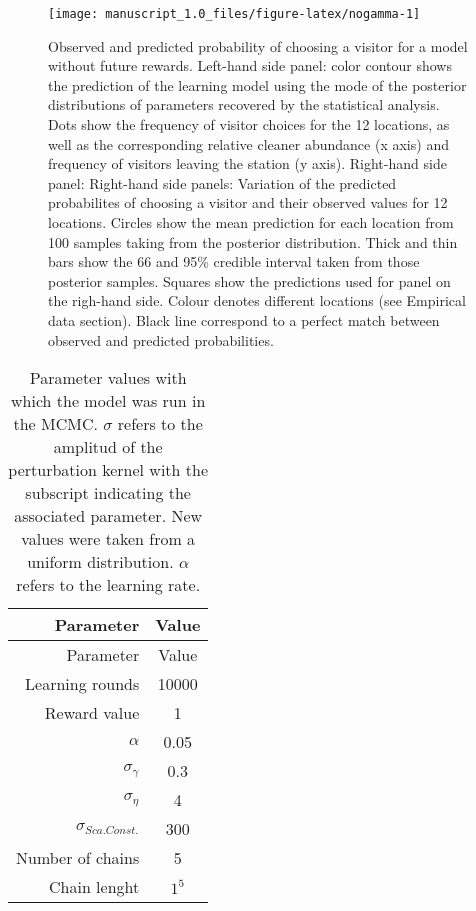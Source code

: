 \documentclass[]{rsos}%
\begin{document}
\begin{figure}[H]

{\centering \texttt{[image: manuscript\_1.0\_files/figure-latex/nogamma-1]} 

}

\caption{Observed and predicted probability of choosing a visitor for a model without future rewards. Left-hand side panel: color contour shows the prediction of the learning model using the mode of the posterior distributions of parameters recovered by the statistical analysis. Dots show the frequency of visitor choices for the 12 locations, as well as the corresponding relative cleaner abundance (x axis) and frequency of visitors leaving the station (y axis). Right-hand side panel: Right-hand side panels: Variation of the predicted probabilites  of choosing a visitor and their observed values for 12 locations. Circles show the mean prediction for each location from 100 samples taking from the posterior distribution. Thick and thin bars show the 66 and 95\% credible interval taken from those posterior samples. Squares show the predictions used for panel on the righ-hand side. Colour denotes different locations (see Empirical data section). Black line correspond to a perfect match between observed and predicted probabilities.}\label{fig:nogamma}
\end{figure}

\begin{longtable}[]{@{}rc@{}}
\caption{\label{tab:param} Parameter values with which the model was run
in the MCMC. \(\sigma\) refers to the amplitud of the perturbation kernel with the subscript indicating the associated parameter. New values were taken from a uniform distribution. \(\alpha\) refers to the learning rate.}\tabularnewline
\toprule
Parameter & Value \\
\midrule
\endfirsthead
\toprule
Parameter & Value \\
\midrule
\endhead
Learning rounds & 10000 \\
Reward value & 1 \\
\(\alpha\) & 0.05 \\
\(\sigma_{\gamma}\) & 0.3 \\
\(\sigma_{\eta}\) & 4 \\
\(\sigma_{Sca.Const.}\) & 300 \\
Number of chains & 5 \\
Chain lenght & \(1^5\) \\
\bottomrule
\end{longtable}
\end{document}
